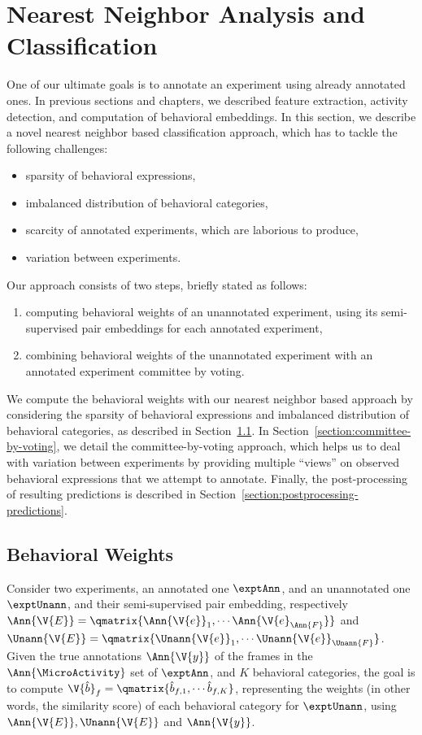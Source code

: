 \section{Nearest Neighbor Analysis and Classification}\label{section:nearest-neighbors-classification}
One of our ultimate goals is to annotate an experiment using already annotated ones.
In previous sections and chapters, we described feature extraction, activity detection, and computation of behavioral embeddings.
In this section, we describe a novel nearest neighbor based classification approach, which has to tackle the following challenges:
\begin{itemize}
	\item sparsity of behavioral expressions,
	\item imbalanced distribution of behavioral categories,
	\item scarcity of annotated experiments, which are laborious to produce,
	\item variation between experiments.
\end{itemize}
Our approach consists of two steps, briefly stated as follows:
\begin{enumerate}
	\item computing behavioral weights of an unannotated experiment, using its semi-supervised pair embeddings for each annotated  experiment,
	\item combining behavioral weights of the unannotated experiment with an annotated experiment committee by voting.
\end{enumerate}
We compute the behavioral weights with our nearest neighbor based approach by considering the sparsity of behavioral expressions and imbalanced distribution of behavioral categories, as described in Section~\ref{section:behavioral-weights}.
In Section~\ref{section:committee-by-voting}, we detail the committee-by-voting approach, which helps us to deal with variation between experiments by providing multiple ``views'' on observed behavioral expressions that we attempt to annotate. Finally, the post-processing of resulting predictions is described in Section~\ref{section:postprocessing-predictions}.

\subsection{Behavioral Weights}\label{section:behavioral-weights}
Consider two experiments, an annotated one $\exptAnn$, and an unannotated one $\exptUnann$, and their semi-supervised pair embedding, respectively $\Ann{\V{E}}=\qmatrix{\Ann{\V{e}}_1, \cdots \Ann{\V{e}_{\Ann{F}}}}$ and $\Unann{\V{E}}=\qmatrix{\Unann{\V{e}}_1, \cdots \Unann{\V{e}}_{\Unann{F}}}$.
Given the true annotations $\Ann{\V{y}}$ of the frames in the $\Ann{\MicroActivity}$ set of $\exptAnn$, and $K$ behavioral categories, the goal is to compute $\V{\hat{b}}_f=\qmatrix{\hat{b}_{f,1}, \cdots \hat{b}_{f,K}}$, representing the weights (in other words, the similarity score) of each behavioral category for $\exptUnann$, using $\Ann{\V{E}}, \Unann{\V{E}}$ and $\Ann{\V{y}}$.

